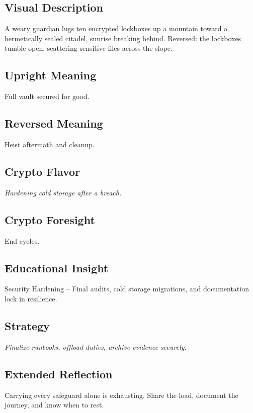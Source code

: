 \documentclass[11pt,oneside]{book}
\begin{document}
\begin{minipage}[t]{0.55\textwidth}
  \vspace{0pt}

  \subsection*{Visual Description}
  A weary guardian lugs ten encrypted lockboxes up a mountain toward a hermetically sealed citadel, sunrise breaking behind. Reversed: the lockboxes tumble open, scattering sensitive files across the slope.

  \subsection*{Upright Meaning}
  Full vault secured for good.

  \subsection*{Reversed Meaning}
  Heist aftermath and cleanup.

  \subsection*{Crypto Flavor}
  \textit{Hardening cold storage after a breach.}

  \subsection*{Crypto Foresight}
  End cycles.

  \subsection*{Educational Insight}
  Security Hardening – Final audits, cold storage migrations, and documentation lock in resilience.

  \subsection*{Strategy}
  \textit{Finalize runbooks, offload duties, archive evidence securely.}

  \subsection*{Extended Reflection}
  Carrying every safeguard alone is exhausting. Share the load, document the journey, and know when to rest.


\end{minipage}
\end{document}
